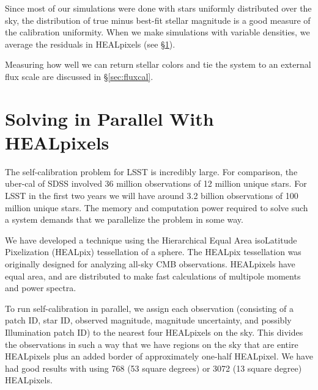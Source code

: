 \documentclass[12pt,preprint]{aastex}
\begin{document}
Since most of our simulations were done with stars uniformly distributed over the sky, the distribution of true minus best-fit stellar magnitude is a good measure of the calibration uniformity.  When we make simulations with variable densities, we average the residuals in HEALpixels (see \S\ref{sec:hp}).

Measuring how well we can return stellar colors and tie the system to an external flux scale are discussed in \S\ref{sec:fluxcal}.



\section{Solving in Parallel With HEALpixels}\label{sec:hp}

The self-calibration problem for LSST is incredibly large.  For comparison, the uber-cal of SDSS involved 36 million observations of 12 million unique stars.  For LSST in the first two years we will have around 3.2 billion observations of 100 million unique stars.  The memory and computation power required to solve such a system demands that we parallelize the problem in some way.

We have developed a technique using the Hierarchical Equal Area isoLatitude Pixelization (HEALpix) tessellation of a sphere.  The HEALpix tessellation was originally designed for analyzing all-sky CMB observations.  HEALpixels have equal area, and are distributed to make fast calculations of multipole moments and power spectra.  

To run self-calibration in parallel, we assign each observation (consisting of a patch ID, star ID, observed magnitude, magnitude uncertainty, and possibly Illumination patch ID) to the nearest four HEALpixels on the sky.  This divides the observations in such a way that we have regions on the sky that are entire HEALpixels plus an added border of approximately one-half HEALpixel.  We have had good results with using 768 (53 square degrees) or 3072 (13 square degree) HEALpixels.  
\end{document}
